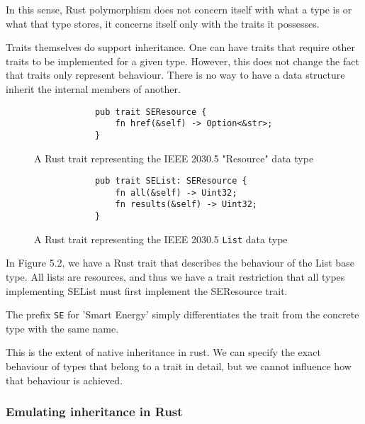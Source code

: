 In this sense, Rust polymorphism does not concern itself with what a type is or what that type stores, it concerns itself only with the traits it possesses.

Traits themselves do support inheritance. One can have traits that require other traits to be implemented for a given type. However, this does not change the fact that traits only represent behaviour. 
There is no way to have a data structure inherit the internal members of another.

\begin{figure}[H]
    \begin{center}
        \begin{lstlisting}
            pub trait SEResource {
                fn href(&self) -> Option<&str>;
            }
        \end{lstlisting}
        \caption{A Rust trait representing the IEEE 2030.5 "Resource" data type}
    \end{center}
\end{figure}



\begin{figure}[H]
    \begin{center}
        \begin{lstlisting}
            pub trait SEList: SEResource {
                fn all(&self) -> Uint32;
                fn results(&self) -> Uint32;
            }
        \end{lstlisting}
        \caption{A Rust trait representing the IEEE 2030.5 \texttt{List} data type}
    \end{center}
\end{figure}

In Figure 5.2, we have a Rust trait that describes the behaviour of the List base type. All lists are resources, and thus we have a trait restriction that all types implementing SEList must first implement the SEResource trait.

The prefix \texttt{SE} for 'Smart Energy' simply differentiates the trait from the concrete type with the same name.

This is the extent of native inheritance in rust. We can specify the exact behaviour of types that belong to a trait in detail, but we cannot influence how that behaviour is achieved.

\subsubsection{Emulating inheritance in Rust}

